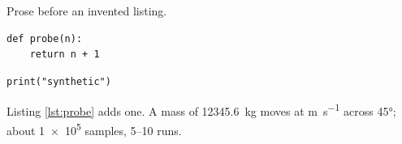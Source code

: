 \documentclass{article}
\begin{document}
Prose before an invented listing.

\lstset{language=Python, numbers=left}
\begin{lstlisting}[caption={An invented probe.}, label=lst:probe]
def probe(n):
    return n + 1
\end{lstlisting}

\begin{verbatim}
print("synthetic")
\end{verbatim}

Listing \ref{lst:probe} adds one. A mass of \SI{12345.6}{\kilo\gram}
moves at \si{\metre\per\second} across \ang{45}; about \num{1e5}
samples, \numrange{5}{10} runs.
\end{document}
